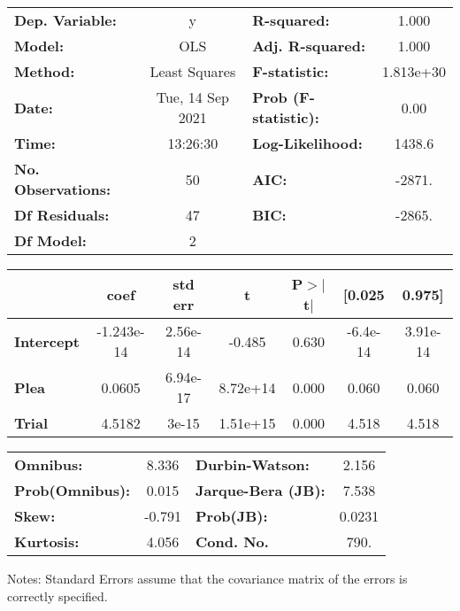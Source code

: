 \begin{center}
\begin{tabular}{lclc}
\toprule
\textbf{Dep. Variable:}    &        y         & \textbf{  R-squared:         } &     1.000   \\
\textbf{Model:}            &       OLS        & \textbf{  Adj. R-squared:    } &     1.000   \\
\textbf{Method:}           &  Least Squares   & \textbf{  F-statistic:       } & 1.813e+30   \\
\textbf{Date:}             & Tue, 14 Sep 2021 & \textbf{  Prob (F-statistic):} &     0.00    \\
\textbf{Time:}             &     13:26:30     & \textbf{  Log-Likelihood:    } &    1438.6   \\
\textbf{No. Observations:} &          50      & \textbf{  AIC:               } &    -2871.   \\
\textbf{Df Residuals:}     &          47      & \textbf{  BIC:               } &    -2865.   \\
\textbf{Df Model:}         &           2      & \textbf{                     } &             \\
\bottomrule
\end{tabular}
\begin{tabular}{lcccccc}
                   & \textbf{coef} & \textbf{std err} & \textbf{t} & \textbf{P$> |$t$|$} & \textbf{[0.025} & \textbf{0.975]}  \\
\midrule
\textbf{Intercept} &   -1.243e-14  &     2.56e-14     &    -0.485  &         0.630        &     -6.4e-14    &     3.91e-14     \\
\textbf{Plea}      &       0.0605  &     6.94e-17     &  8.72e+14  &         0.000        &        0.060    &        0.060     \\
\textbf{Trial}     &       4.5182  &        3e-15     &  1.51e+15  &         0.000        &        4.518    &        4.518     \\
\bottomrule
\end{tabular}
\begin{tabular}{lclc}
\textbf{Omnibus:}       &  8.336 & \textbf{  Durbin-Watson:     } &    2.156  \\
\textbf{Prob(Omnibus):} &  0.015 & \textbf{  Jarque-Bera (JB):  } &    7.538  \\
\textbf{Skew:}          & -0.791 & \textbf{  Prob(JB):          } &   0.0231  \\
\textbf{Kurtosis:}      &  4.056 & \textbf{  Cond. No.          } &     790.  \\
\bottomrule
\end{tabular}
\end{center}

Notes: \newline
 [1] Standard Errors assume that the covariance matrix of the errors is correctly specified.